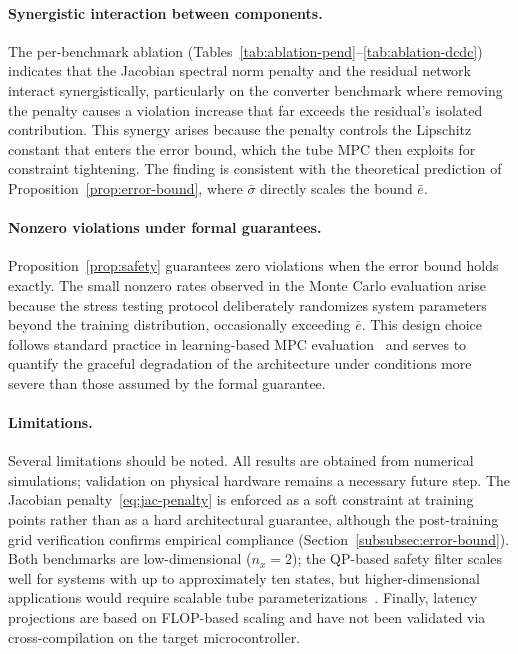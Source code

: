 \documentclass[12pt,a4paper]{article}
\begin{document}
\paragraph{Synergistic interaction between components.}
The per-benchmark ablation
(Tables~\ref{tab:ablation-pend}--\ref{tab:ablation-dcdc}) indicates
that the Jacobian spectral norm penalty and the residual network
interact synergistically, particularly on the converter benchmark where
removing the penalty causes a violation increase that far exceeds the
residual's isolated contribution. This synergy arises because the
penalty controls the Lipschitz constant that enters the error bound,
which the tube MPC then exploits for constraint tightening. The finding
is consistent with the theoretical prediction of
Proposition~\ref{prop:error-bound}, where $\bar\sigma$ directly scales
the bound $\bar{e}$.

\paragraph{Nonzero violations under formal guarantees.}
Proposition~\ref{prop:safety} guarantees zero violations when the error
bound holds exactly. The small nonzero rates observed in the Monte
Carlo evaluation arise because the stress testing protocol deliberately
randomizes system parameters beyond the training distribution,
occasionally exceeding $\bar{e}$. This design choice follows standard
practice in learning-based MPC
evaluation~\cite{koller2022learning,gao2024rigid} and serves to
quantify the graceful degradation of the architecture under conditions
more severe than those assumed by the formal guarantee.

\paragraph{Limitations.}
Several limitations should be noted. All results are obtained from
numerical simulations; validation on physical hardware remains a
necessary future step. The Jacobian penalty~\eqref{eq:jac-penalty} is
enforced as a soft constraint at training points rather than as a hard
architectural guarantee, although the post-training grid verification
confirms empirical compliance (Section~\ref{subsubsec:error-bound}).
Both benchmarks are low-dimensional ($n_x = 2$); the QP-based safety
filter scales well for systems with up to approximately ten states, but
higher-dimensional applications would require scalable tube
parameterizations~\cite{gao2024rigid}. Finally, latency projections are
based on FLOP-based scaling and have not been validated via
cross-compilation on the target microcontroller.
\end{document}
